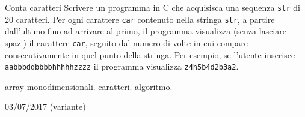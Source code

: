 \begin{exrev}{Conta caratteri}
Scrivere un programma in C che acquisisca una sequenza \texttt{str} di 20 caratteri. Per ogni carattere \texttt{car} contenuto nella stringa \texttt{str}, a partire dall'ultimo fino ad arrivare al primo, il programma visualizza (senza lasciare spazi) il carattere \texttt{car}, seguito dal numero di volte in cui compare consecutivamente in quel punto della stringa. Per esempio, se l'utente inserisce \texttt{aabbbddbbbbhhhhhzzzz} il programma visualizza \texttt{z4h5b4d2b3a2}.


\begin{tags}
array monodimensionali. caratteri. algoritmo.
\end{tags}

\begin{esame}
03/07/2017 (variante)
\end{esame}








\end{exrev}


